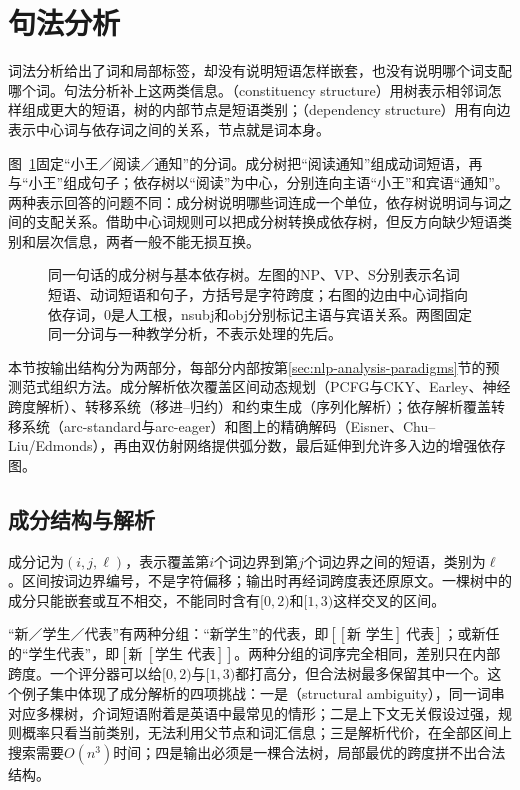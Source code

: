 \section{句法分析}
\label{sec:nlp-analysis-syntax}

词法分析给出了词和局部标签，却没有说明短语怎样嵌套，也没有说明哪个词支配哪个词。句法分析补上这两类信息。（constituency structure）用树表示相邻词怎样组成更大的短语，树的内部节点是短语类别；（dependency structure）用有向边表示中心词与依存词之间的关系，节点就是词本身。

图~\ref{fig:nlp-analysis-syntax}固定“小王／阅读／通知”的分词。成分树把“阅读通知”组成动词短语，再与“小王”组成句子；依存树以“阅读”为中心，分别连向主语“小王”和宾语“通知”。两种表示回答的问题不同：成分树说明哪些词连成一个单位，依存树说明词与词之间的支配关系。借助中心词规则可以把成分树转换成依存树，但反方向缺少短语类别和层次信息，两者一般不能无损互换。

\begin{figure}[htbp]
  \centering
  
  \caption{同一句话的成分树与基本依存树。左图的NP、VP、S分别表示名词短语、动词短语和句子，方括号是字符跨度；右图的边由中心词指向依存词，0是人工根，nsubj和obj分别标记主语与宾语关系。两图固定同一分词与一种教学分析，不表示处理的先后。}
  \label{fig:nlp-analysis-syntax}
\end{figure}

本节按输出结构分为两部分，每部分内部按第\ref{sec:nlp-analysis-paradigms}节的预测范式组织方法。成分解析依次覆盖区间动态规划（PCFG与CKY、Earley、神经跨度解析）、转移系统（移进--归约）和约束生成（序列化解析）；依存解析覆盖转移系统（arc-standard与arc-eager）和图上的精确解码（Eisner、Chu--Liu/Edmonds），再由双仿射网络提供弧分数，最后延伸到允许多入边的增强依存图。

\subsection{成分结构与解析}
\label{sec:nlp-analysis-constituency}

成分记为$(i,j,\ell)$，表示覆盖第$i$个词边界到第$j$个词边界之间的短语，类别为$\ell$。区间按词边界编号，不是字符偏移；输出时再经词跨度表还原原文。一棵树中的成分只能嵌套或互不相交，不能同时含有$[0,2)$和$[1,3)$这样交叉的区间。

“新／学生／代表”有两种分组：“新学生”的代表，即$[[\text{新 学生}]\ \text{代表}]$；或新任的“学生代表”，即$[\text{新}\ [\text{学生 代表}]]$。两种分组的词序完全相同，差别只在内部跨度。一个评分器可以给$[0,2)$与$[1,3)$都打高分，但合法树最多保留其中一个。这个例子集中体现了成分解析的四项挑战：一是（structural ambiguity），同一词串对应多棵树，介词短语附着是英语中最常见的情形；二是上下文无关假设过强，规则概率只看当前类别，无法利用父节点和词汇信息；三是解析代价，在全部区间上搜索需要$O(n^3)$时间；四是输出必须是一棵合法树，局部最优的跨度拼不出合法结构。

